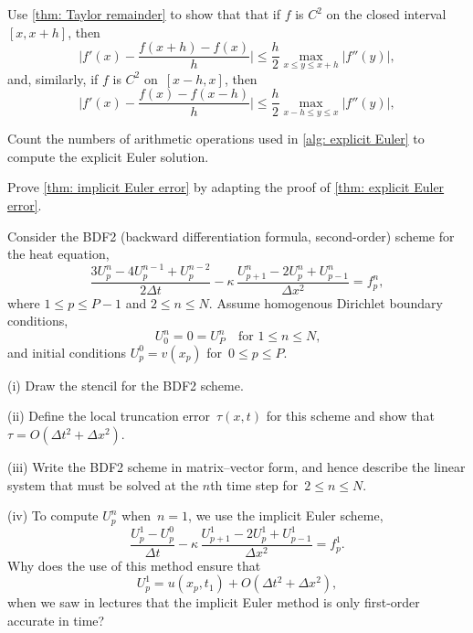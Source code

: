 \begin{Exercises}
\exercise\label{ex: forward diff}
Use \cref{thm: Taylor remainder} to show that that if $f$ is $C^2$ on 
the closed interval~$[x,x+h]$, then
\[
\biggl|f'(x)-\frac{f(x+h)-f(x)}{h}\biggr|
	\le\frac{h}{2}\max_{x\le y\le x+h}|f''(y)|,
\]
and, similarly, if $f$ is $C^2$ on~$[x-h,x]$, then
\[
\biggl|f'(x)-\frac{f(x)-f(x-h)}{h}\biggr|
	\le\frac{h}{2}\max_{x-h\le y\le x}|f''(y)|,
\]

\exercise
Count the numbers of arithmetic operations used in \cref{alg: explicit Euler} 
to compute the explicit Euler solution.

\exercise\label{ex: implicit Euler error}
Prove \cref{thm: implicit Euler error} by adapting the proof of 
\cref{thm: explicit Euler error}.

\exercise
Consider the BDF2 (backward differentiation formula, second-order)
scheme for the heat equation,
\[
\frac{3U^n_p-4U^{n-1}_p+U^{n-2}_p}{2\Delta t}
        -\kappa\,\frac{U^n_{p+1}-2U^n_p+U^n_{p-1}}{\Delta x^2}=f^n_p,
\]
where $1\le p\le P-1$ and $2\le n\le N$.  Assume homogenous Dirichlet
boundary conditions,
\[
U^n_0=0=U^n_P\quad\text{for $1\le n\le N$,}
\]
and initial conditions $U^0_p=v(x_p)$ for~$0\le p\le P$.
\begin{description}
\item{(i)} Draw the stencil for the BDF2 scheme.
\item{(ii)} Define the local truncation error~$\tau(x,t)$ for this
scheme and show that $\tau=O(\Delta t^2+\Delta x^2)$.
\item{(iii)} Write the BDF2 scheme in matrix--vector form, and hence
describe the linear system that must be solved at the $n$th time step
for~$2\le n\le N$.
\item{(iv)} To compute $U^n_p$ when~$n=1$, we use the implicit Euler
scheme,
\[
\frac{U^1_p-U^0_p}{\Delta t}
        -\kappa\,\frac{U^1_{p+1}-2U^1_p+U^1_{p-1}}{\Delta x^2}=f^1_p.
\]
Why does the use of this method ensure that
\[
U^1_p=u(x_p,t_1)+O(\Delta t^2+\Delta x^2),
\]
when we saw in lectures that the implicit Euler method is only
first-order accurate in time?  
\end{description}

\end{Exercises}
